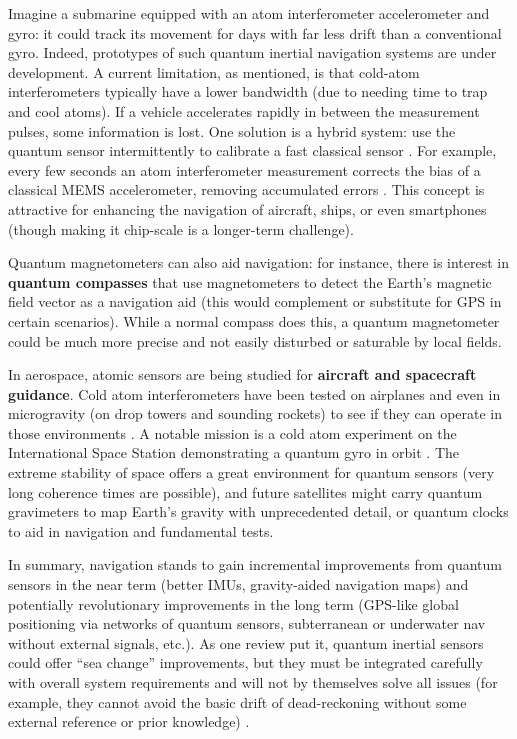 Imagine a submarine equipped with an atom interferometer accelerometer
and gyro: it could track its movement for days with far less drift
than a conventional gyro. Indeed, prototypes of such quantum inertial
navigation systems are under development. A current limitation, as
mentioned, is that cold-atom interferometers typically have a lower
bandwidth (due to needing time to trap and cool atoms). If a vehicle
accelerates rapidly in between the measurement pulses, some
information is lost. One solution is a hybrid system: use the quantum
sensor intermittently to calibrate a fast classical sensor . For
example, every few seconds an atom interferometer measurement corrects
the bias of a classical MEMS accelerometer, removing accumulated
errors . This concept is attractive for enhancing the navigation of
aircraft, ships, or even smartphones (though making it chip-scale is a
longer-term challenge).



Quantum magnetometers can also aid navigation: for instance, there is
interest in \textbf{quantum compasses} that use magnetometers to
detect the Earth’s magnetic field vector as a navigation aid (this
would complement or substitute for GPS in certain scenarios). While a
normal compass does this, a quantum magnetometer could be much more
precise and not easily disturbed or saturable by local fields.



In aerospace, atomic sensors are being studied for \textbf{aircraft
  and spacecraft guidance}. Cold atom interferometers have been tested
on airplanes and even in microgravity (on drop towers and sounding
rockets) to see if they can operate in those environments . A notable
mission is a cold atom experiment on the International Space Station
demonstrating a quantum gyro in orbit . The extreme stability of space
offers a great environment for quantum sensors (very long coherence
times are possible), and future satellites might carry quantum
gravimeters to map Earth’s gravity with unprecedented detail, or
quantum clocks to aid in navigation and fundamental tests.



In summary, navigation stands to gain incremental improvements from
quantum sensors in the near term (better IMUs, gravity-aided
navigation maps) and potentially revolutionary improvements in the
long term (GPS-like global positioning via networks of quantum
sensors, subterranean or underwater nav without external signals,
etc.). As one review put it, quantum inertial sensors could offer “sea
change” improvements, but they must be integrated carefully with
overall system requirements and will not by themselves solve all
issues (for example, they cannot avoid the basic drift of
dead-reckoning without some external reference or prior knowledge) .



